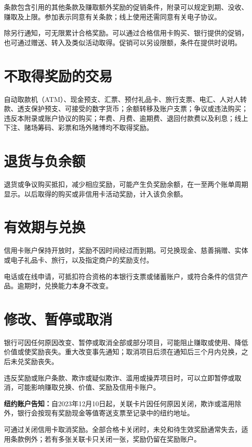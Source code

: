 \documentclass[UTF8,fontset=none,11pt,a4paper]{ctexart}
\begin{document}
条款包含引用的其他条款及赚取额外奖励的促销条件，附录可以规定到期、没收、赚取及上限。参加表示同意有关条款；线上使用还需同意有关\allowbreak\mbox{电子协议。}


除另行通知，可无限累计合格奖励。可以通过合格信用卡购买、银行提供的促销，也可通过赠送、转入及类似活动取得。促销可以另设限额，条件在提\allowbreak\mbox{供时说明。}


\section*{不取得奖励的交易}
自动取款机（ATM）、现金预支、汇票、预付礼品卡、旅行支票、电汇、人对人转款、透支保护预支、可接受的数字货币；余额转移及账户支票；争议或违法购买；违反本附录或账户协议的购买；年费、月费、逾期费、退回付款费以及利息；线上下注、赌场筹码、彩票和场外赌博均不取\allowbreak\mbox{得奖励。}


\section*{退货与负余额}
退货或争议购买抵扣，减少相应奖励，可能产生负奖励余额，在一至两个账单周期显示。以后取得的购买或非信用卡活动奖励，计入\allowbreak\mbox{该负余额。}


\section*{有效期与兑换}
信用卡账户保持开放时，奖励不因时间经过而到期。可兑换现金、慈善捐赠、实体或电子礼品卡、旅行，以及指定商户的\allowbreak\mbox{奖励支付。}


电话或在线申请，可抵扣符合资格的本银行支票或储蓄账户，或符合条件的信贷产品。逾期时，兑换能力本\allowbreak\mbox{身不改变。}


\section*{修改、暂停或取消}
银行可因任何原因改变、暂停或取消全部或部分项目，可能阻止赚取或使用、降低价值或使奖励丧失。重大改变事先通知；取消项目后须在通知后三个月内兑换，之后未兑\allowbreak\mbox{奖励丧失。}


违反奖励或账户条款、欺诈或疑似欺诈、滥用或操弄项目时，可以立即暂停或取消，可能影响赚取兑换、价值、奖励及信\allowbreak\mbox{用卡账户。}


\textbf{纽约账户告知：}自2023年12月10日起，关联卡片因任何原因关闭，欺诈或滥用除外，银行会按现有奖励现金等值寄送支票至记录中的\allowbreak\mbox{纽约地址。}


可通过关闭信用卡取消奖励。全部合格卡关闭时，未兑和待生效奖励通常失去，适用条款例外；若有多张关联卡只关闭一张，奖励仍留在\allowbreak\mbox{奖励账户。}
\end{document}
